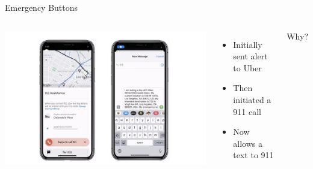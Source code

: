 \documentclass[nobackground,dvipsnames,table,aspectratio=169]{beamer}
\begin{document}
\begin{frame}{Emergency Buttons}
    \begin{columns}
            \includegraphics[width=\textwidth]{emergency-buttons}
            \begin{itemize}
                \item Initially sent alert to Uber
                \item Then initiated a 911 call
                \item Now allows a text to 911
            \end{itemize}
            Why?
    \end{columns}
\end{frame}
\end{document}
